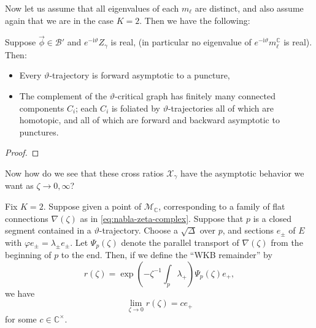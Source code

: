 \documentclass[12pt,letterpaper,reqno]{article}
\numberwithin{equation}{section}
\newcommand{\cB}{\ensuremath{\mathcal B}}
\newcommand{\cM}{\ensuremath{\mathcal M}}
\newcommand{\cX}{\ensuremath{\mathcal X}}
\newcommand{\C}{\ensuremath{\mathbb C}}
\newcommand{\I}{{\mathrm i}}
\newcommand{\insfig}[2]{

\medskip
\noindent
\begin{minipage}{\linewidth}

\makebox[\linewidth]{\texttt{[image: figures/\#1-crop.pdf]}}

\end{minipage}
\medskip

}
\newcommand{\fixme}[1]{{\color{orange}{[#1]}}}
\begin{document}
Now let us assume that all eigenvalues of each $m_\ell$
are distinct, and also assume again that we are in the
case $K=2$. Then we have the following:

\begin{prop} Suppose $\vec\phi \in \cB'$
and $e^{-\I \vartheta} Z_\gamma$ is real,
(in particular no eigenvalue of $e^{-\I \vartheta} m^\C_\ell$ is real).
Then:
\begin{itemize}
\item Every $\vartheta$-trajectory is forward asymptotic to a puncture,
\item The complement of the $\vartheta$-critical graph
has finitely many connected components
$C_i$; each $C_i$ is foliated by $\vartheta$-trajectories all of which are homotopic, and all of which are forward and backward asymptotic to punctures.
\end{itemize}
\end{prop}

\insfig{higgs-bundles-23}{1.1}

\begin{proof}
\fixme{...}
\end{proof}

\fixme{WKB triangulation}

\fixme{small flat sections}

\fixme{definition of cross ratios}

\fixme{jumps of cross ratios when saddle connection appears}

\fixme{interpretation of cross ratios as abelianization}

Now how do we see that these cross ratios $\cX_\gamma$
have the asymptotic behavior we want as $\zeta \to 0, \infty$?

\begin{prop}
Fix $K=2$.
Suppose given a point of $\cM_\C$, corresponding to a family
of flat connections $\nabla(\zeta)$ as
in \eqref{eq:nabla-zeta-complex}. Suppose that $p$ is
a closed segment contained in a $\vartheta$-trajectory.
Choose a $\sqrt{\Delta}$ over $p$,
and sections $e_\pm$ of $E$ with $\varphi e_\pm = \lambda_\pm e_\pm$.
Let $\Psi_p(\zeta)$ denote the parallel transport of $\nabla(\zeta)$
from the beginning of $p$ to the end.
Then, if we define the ``WKB remainder'' by
\begin{equation}
  r(\zeta) = \exp \left(-\zeta^{-1} \int_p \lambda_+\right) \Psi_p(\zeta) e_+,
\end{equation}
we have
\begin{equation}
  \lim_{\zeta \to 0} r(\zeta) = c e_+
\end{equation}
for some $c \in \C^\times$.
\end{prop}
\end{document}
